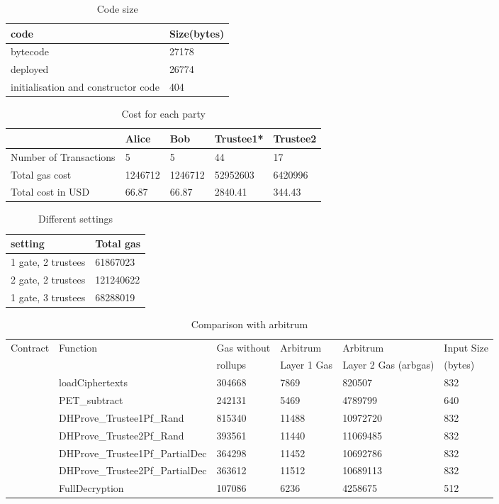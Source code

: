 \begin{table}[]
	\begin{tabular}{|l|l|}
		\hline
		code	& Size(bytes)  \\ \hline
		bytecode	& 27178  \\ \hline
		deployed	& 26774  \\ \hline
		initialisation and constructor code 	& 404 \\ \hline
	\end{tabular}
	\caption{Code size}
\end{table}

\begin{table}[]
	\begin{tabular}{|l|l|l|l|l|}
		\hline
		& Alice &  Bob & Trustee1*  & Trustee2  \\ \hline
		Number of Transactions	& 5 &5  &44  &17  \\ \hline
		Total gas cost	& 1246712 &  1246712& 52952603  & 6420996 \\ \hline
		Total cost in USD	&  66.87& 66.87 &2840.41  & 344.43 \\ \hline
	\end{tabular}
	\caption{Cost for each party} 
\end{table}

\begin{table}[]
	\begin{tabular}{|l|l|}
	\hline
	setting	& Total gas  \\ \hline
	1 gate, 2 trustees	& 61867023  \\ \hline
	2 gate, 2 trustees	&  121240622 \\ \hline
	1 gate, 3 trustees	& 68288019 \\ \hline
\end{tabular}
	\caption{Different settings}
\end{table}

\begin{table}[]
	\begin{tabular}{|l|l|l|l|l|l|}
		\hline
		Contract & Function  & Gas without  & Arbitrum  & Arbitrum & Input Size \\ 
		 &   &  rollups &  Layer 1 Gas &Layer 2 Gas (arbgas)& (bytes) \\ \hline
		\multirow{8}{*}{} 
		&  loadCiphertexts & 304668 & 7869 & 820507& 832\\  \cline{2-6}
		& PET\_subtract & 242131 & 5469& 4789799& 640\\  \cline{2-6}
		&  DHProve\_Trustee1Pf\_Rand& 815340 &  11488& 10972720& 832\\  \cline{2-6}
		PET.sol	&  DHProve\_Trustee2Pf\_Rand& 393561 &11440& 11069485 & 832 \\  \cline{2-6}
		&  DHProve\_Trustee1Pf\_PartialDec& 364298 & 11452& 10692786& 832\\  \cline{2-6}
		& DHProve\_Trustee2Pf\_PartialDec & 363612 & 11512& 10689113& 832\\  \cline{2-6}
		& FullDecryption  &  107086& 6236& 4258675 & 512\\  \hline
	\end{tabular}
	\caption{Comparison with arbitrum} 
\end{table}

